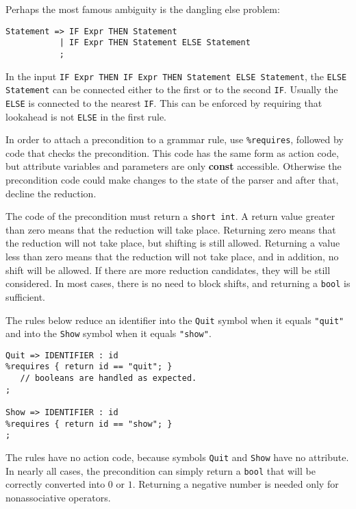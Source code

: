 \documentclass{article}
\begin{document}
\noindent
Perhaps the most famous ambiguity is the dangling else problem:
\begin{verbatim}
Statement => IF Expr THEN Statement
           | IF Expr THEN Statement ELSE Statement  
           ;   \end{verbatim}
In the input \verb+IF Expr THEN IF Expr THEN Statement ELSE Statement+,
the \verb+ELSE Statement+ can be connected either to the 
first or to the second \verb+IF+.
Usually the \verb+ELSE+ is connected to the
nearest \verb+IF+. This can be enforced by requiring that
lookahead is not \verb+ELSE+ in the first rule.

In order to attach a precondition to a grammar rule, use 
\verb+%requires+, followed by code that checks the precondition.
This code has the same form as action code, but attribute variables
and parameters are only {\bf const} accessible. Otherwise
the precondition code could make changes to the state of the parser
and after that, decline the reduction. 

The code of the precondition must return a \verb+short int+.
A return value greater than zero means that the reduction
will take place. Returning zero means that the reduction will not
take place, but shifting is still allowed.  
Returning a value less than zero means that the reduction will not
take place, and in addition, no shift will be allowed. If there
are more reduction candidates, they will be still considered. 
In most cases, there is no need to block shifts, and returning
a \verb+bool+ is sufficient.

The rules below reduce an identifier into the \verb+Quit+ symbol
when it equals \verb+"quit"+ and
into the \verb+Show+ symbol when it equals \verb+"show"+. 
\begin{verbatim}
Quit => IDENTIFIER : id
%requires { return id == "quit"; }
   // booleans are handled as expected. 
; 

Show => IDENTIFIER : id
%requires { return id == "show"; }
; \end{verbatim}
The rules have no action code, because symbols \verb+Quit+ and
\verb+Show+ have no attribute.
In nearly all cases, the precondition can simply return a 
\verb+bool+ that will be correctly converted into $ 0 $ or $ 1. $ 
Returning a negative number is needed only for nonassociative
operators.
\end{document}
